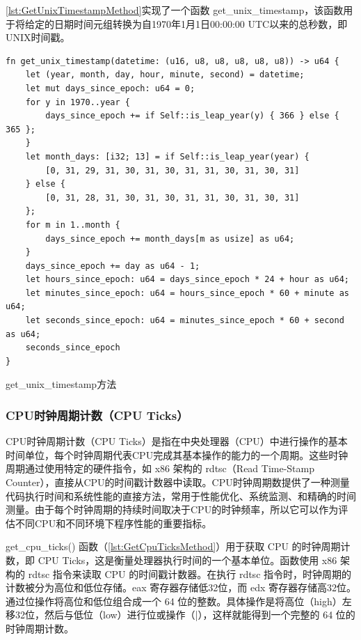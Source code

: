 \cref{lst:GetUnixTimestampMethod}实现了一个函数 get\_unix\_timestamp，该函数用于将给定的日期时间元组转换为自1970年1月1日00:00:00 UTC以来的总秒数，即UNIX时间戳。

\begin{listing}[htbp]
    \begin{verbatim}
fn get_unix_timestamp(datetime: (u16, u8, u8, u8, u8, u8)) -> u64 {
    let (year, month, day, hour, minute, second) = datetime;
    let mut days_since_epoch: u64 = 0;
    for y in 1970..year {
        days_since_epoch += if Self::is_leap_year(y) { 366 } else { 365 };
    }
    let month_days: [i32; 13] = if Self::is_leap_year(year) {
        [0, 31, 29, 31, 30, 31, 30, 31, 31, 30, 31, 30, 31]
    } else {
        [0, 31, 28, 31, 30, 31, 30, 31, 31, 30, 31, 30, 31]
    };
    for m in 1..month {
        days_since_epoch += month_days[m as usize] as u64;
    }
    days_since_epoch += day as u64 - 1;
    let hours_since_epoch: u64 = days_since_epoch * 24 + hour as u64;
    let minutes_since_epoch: u64 = hours_since_epoch * 60 + minute as u64;
    let seconds_since_epoch: u64 = minutes_since_epoch * 60 + second as u64;
    seconds_since_epoch
}
    \end{verbatim}
    \caption{get\_unix\_timestamp方法}\label{lst:GetUnixTimestampMethod}
\end{listing}

\subsubsection{CPU时钟周期计数（CPU Ticks）}

CPU时钟周期计数（CPU Ticks）是指在中央处理器（CPU）中进行操作的基本时间单位，每个时钟周期代表CPU完成其基本操作的能力的一个周期。这些时钟周期通过使用特定的硬件指令，如 x86 架构的 rdtsc（Read Time-Stamp Counter），直接从CPU的时间戳计数器中读取。CPU时钟周期数提供了一种测量代码执行时间和系统性能的直接方法，常用于性能优化、系统监测、和精确的时间测量。由于每个时钟周期的持续时间取决于CPU的时钟频率，所以它可以作为评估不同CPU和不同环境下程序性能的重要指标。

get\_cpu\_ticks() 函数（\cref{lst:GetCpuTicksMethod}）用于获取 CPU 的时钟周期计数，即 CPU Ticks，这是衡量处理器执行时间的一个基本单位。函数使用 x86 架构的 rdtsc 指令来读取 CPU 的时间戳计数器。在执行 rdtsc 指令时，时钟周期的计数被分为高位和低位存储。eax 寄存器存储低32位，而 edx 寄存器存储高32位。通过位操作将高位和低位组合成一个 64 位的整数。具体操作是将高位（high）左移32位，然后与低位（low）进行位或操作（|），这样就能得到一个完整的 64 位的时钟周期计数。

